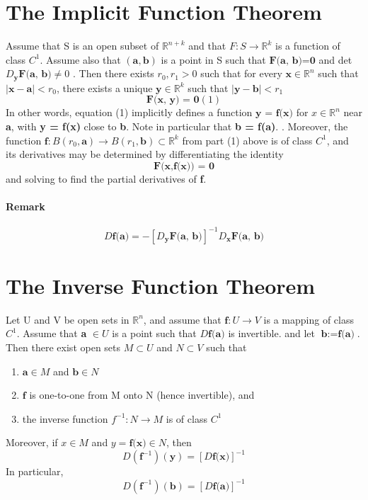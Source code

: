 \documentclass[11pt]{article}
\newcommand{\tb}[1]{\textbf{#1}}
\newcommand{\real}[0]{\mathbb{R}}
\newcommand{\func}[3]{\tb{#1}: {#2} \rightarrow {#3} }
\begin{document}
\section{The Implicit Function Theorem}
Assume that S is an open subset of $\real^{n+k}$ and that $F: S \rightarrow \real^k$ is a function of class $C^1$. Assume also that $(\tb{a}, \tb{b})$ is a point in S such that $\tb{F(a, b)=0}$ and det$D_{\tb{y}}\tb{F(a, b)} \neq 0$ . Then there exists $r_0, r_1 > 0$ such that for every $\tb{x} \in \real^n$ such that $|\tb{x} - \tb{a}| < r_0$, there exists a unique $\tb{y} \in \real^k$ such that $|\tb{y} - \tb{b}| < r_1$
    $$\tb{F(x, y) = 0} (1)$$
    In other words, equation (1) implicitly defines a function $\tb{y = f(x)}$ for $x \in \real^n$ near \tb{a}, with \tb{y = f(x)} close to \tb{b}. Note in particular that \tb{b = f(a)}. . Moreover, the function $\tb{f}: B(r_0,\tb{a}) \rightarrow B(r_1, \tb{b}) \subset \real^k$ from part (1) above is of class $C^1$, and its derivatives may be determined by differentiating the identity $$\tb{F(x,f(x)) = 0}$$ and solving to find the partial derivatives of \tb{f}.
\paragraph{Remark} $$D\tb{f(a)} = -[D_\tb{y}\tb{F(a, b)}]^{-1}D_\tb{x}\tb{F(a, b)}$$
\section{The Inverse Function Theorem} Let U and V be open sets in $\real^n$, and assume that $\func{f}{U}{V}$ is a mapping of class $C^1$. \newline
Assume that \tb{a} $\in U$ is a point such that $D\tb{f(a)}$ is invertible. \newline
and let $\tb{b} := \tb{f(a)}$. Then there exist open sets $M \subset U$ and $N \subset V$ such that
\begin{enumerate}
    \item $\tb{a} \in M$ and $\tb{b} \in N$
    \item $\tb{f}$ is one-to-one from M onto N (hence invertible), and
    \item the inverse function $f^{-1}: N \rightarrow M$ is of class $C^1$
\end{enumerate}
Moreover, if $x \in M$ and $y = \tb{f(x)}\in N$, then $$D(\tb{f}^{-1})(\tb{y}) = [D\tb{f(x)}]^{-1}$$
In particular, $$D(\tb{f}^{-1})(\tb{b}) = [D\tb{f(a)}]^{-1}$$
\end{document}
